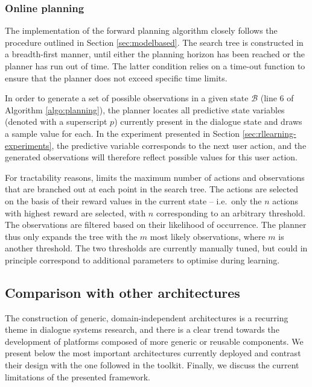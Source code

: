 \subsubsection*{Online planning}
The implementation of the forward planning algorithm closely follows the procedure outlined in Section \ref{sec:modelbased}.  The search tree is constructed in a breadth-first manner, until either the planning horizon has been reached or the planner has run out of time.  The latter condition relies on a time-out function to ensure that the planner does not exceed specific time limits.

In order to generate a set of possible observations in a given state $\mathcal{B}$ (line 6 of Algorithm \ref{algo:planning}), the planner locates all predictive state variables (denoted with a superscript $p$) currently present in the dialogue state and draws a sample value for each.  In the experiment presented in Section \ref{sec:rllearning-experiments}, the predictive variable corresponds to the next user action, and the generated observations will therefore reflect possible values for this user action.

For tractability reasons, \opendial{} limits the maximum number of actions and observations that are branched out at each point in the search tree.  The actions are selected on the basis of their reward values in the current state -- i.e.\ only the $n$ actions with highest reward are selected, with $n$ corresponding to an arbitrary threshold. The observations are filtered based on their likelihood of occurrence.  The planner thus only expands the tree with the $m$ most likely observations, where $m$ is another threshold. The two thresholds are currently manually tuned, but could in principle correspond to additional parameters to optimise during learning. 

\subsection{Comparison with other architectures}
\label{sec:archi-comparison}

The construction of generic, domain-independent architectures is a recurring theme in dialogue systems research, and there is a clear trend towards the development of platforms composed of more generic or reusable components. We present below the most important architectures currently deployed and contrast their design with the one followed in the \opendial{} toolkit. Finally, we discuss the current limitations of the presented framework.

